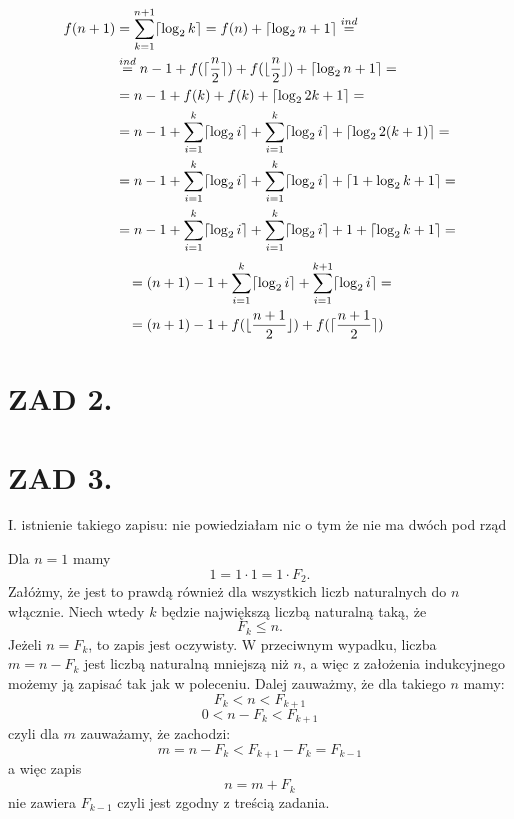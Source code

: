 \documentclass{article}[13pt]
\begin{document}
    \begin{align*}
        f(n+1)&=\sum\limits_{k=1}^{n+1}\lceil\log_2k\rceil=f(n)+\lceil\log_2n+1\rceil\overset{ind}{=}\\
        &\overset{ind}{=}n-1+f(\lceil{n\over2}\rceil)+f(\lfloor{n\over2}\rfloor)+\lceil\log_2n+1\rceil=\\
        &=n-1+f(k)+f(k)+\lceil\log_22k+1\rceil=\\
        &=n-1+\sum\limits_{i=1}^{k}\lceil\log_2i\rceil+\sum\limits_{i=1}^k\lceil\log_2i\rceil+\lceil\log_22(k+1)\rceil=\\
        &=n-1+\sum\limits_{i=1}^{k}\lceil\log_2i\rceil+\sum\limits_{i=1}^k\lceil\log_2i\rceil+\lceil1+\log_2k+1\rceil=\\
        &=n-1+\sum\limits_{i=1}^{k}\lceil\log_2i\rceil+\sum\limits_{i=1}^k\lceil\log_2i\rceil+1+\lceil\log_2k+1\rceil=
    \end{align*}
    \begin{align*}
        &=(n+1)-1+\sum\limits_{i=1}^{k}\lceil\log_2i\rceil+\sum\limits_{i=1}^{k+1}\lceil\log_2i\rceil=\\
        &=(n+1)-1+f(\lfloor{n+1\over2}\rfloor)+f(\lceil{n+1\over2}\rceil)
    \end{align*}


    \section*{ZAD 2.}


    \section*{ZAD 3.}

    I. istnienie takiego zapisu: {\color{acc} nie powiedziałam nic o tym że nie ma dwóch pod rząd}
    \medskip

    Dla $n=1$ mamy
    $$1=1\cdot 1=1\cdot F_2.$$
    Załóżmy, że jest to prawdą również dla wszystkich liczb naturalnych do $n$ włącznie. Niech wtedy $k$ będzie największą liczbą naturalną taką, że
    $$F_k\leq n.$$
    Jeżeli $n=F_k$, to zapis jest oczywisty. W przeciwnym wypadku, liczba $m=n-F_k$ jest liczbą naturalną mniejszą niż $n$, a więc z założenia indukcyjnego możemy ją zapisać tak jak w poleceniu. Dalej zauważmy, że dla takiego $n$ mamy:
    $$F_k< n<F_{k+1}$$
    $$0< n-F_k< F_{k+1}$$
    czyli dla $m$ zauważamy, że zachodzi:
    $$m=n-F_k<F_{k+1}-F_k=F_{k-1}$$
    a więc zapis
    $$n=m+F_k$$
    nie zawiera $F_{k-1}$ czyli jest zgodny z treścią zadania.
    \bigskip
\end{document}
